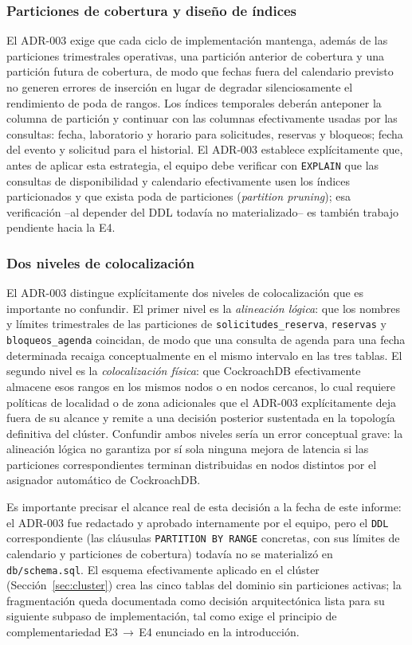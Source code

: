 \documentclass[10pt,twocolumn]{article}
\begin{document}
\subsubsection{Particiones de cobertura y diseño de índices}

El ADR-003 exige que cada ciclo de implementación mantenga, además de las
particiones trimestrales operativas, una partición anterior de cobertura y
una partición futura de cobertura, de modo que fechas fuera del calendario
previsto no generen errores de inserción en lugar de degradar
silenciosamente el rendimiento de poda de rangos. Los índices temporales
deberán anteponer la columna de partición y continuar con las columnas
efectivamente usadas por las consultas: fecha, laboratorio y horario para
solicitudes, reservas y bloqueos; fecha del evento y solicitud para el
historial. El ADR-003 establece explícitamente que, antes de aplicar esta
estrategia, el equipo debe verificar con \texttt{EXPLAIN} que las consultas
de disponibilidad y calendario efectivamente usen los índices particionados
y que exista poda de particiones (\emph{partition pruning}); esa
verificación --al depender del DDL todavía no materializado-- es también
trabajo pendiente hacia la E4.

\subsubsection{Dos niveles de colocalización}

El ADR-003 distingue explícitamente dos niveles de colocalización que es
importante no confundir. El primer nivel es la \emph{alineación lógica}:
que los nombres y límites trimestrales de las particiones de
\texttt{solicitudes\_reserva}, \texttt{reservas} y \texttt{bloqueos\_agenda}
coincidan, de modo que una consulta de agenda para una fecha determinada
recaiga conceptualmente en el mismo intervalo en las tres tablas. El
segundo nivel es la \emph{colocalización física}: que CockroachDB
efectivamente almacene esos rangos en los mismos nodos o en nodos cercanos,
lo cual requiere políticas de localidad o de zona adicionales que el
ADR-003 explícitamente deja fuera de su alcance y remite a una decisión
posterior sustentada en la topología definitiva del clúster. Confundir
ambos niveles sería un error conceptual grave: la alineación lógica no
garantiza por sí sola ninguna mejora de latencia si las particiones
correspondientes terminan distribuidas en nodos distintos por el
asignador automático de CockroachDB.

Es importante precisar el alcance real de esta decisión a la fecha de este
informe: el ADR-003 fue redactado y aprobado internamente por el equipo,
pero el \texttt{DDL} correspondiente (las cláusulas
\texttt{PARTITION BY RANGE} concretas, con sus límites de calendario y
particiones de cobertura) todavía no se materializó en
\texttt{db/schema.sql}. El esquema efectivamente aplicado en el clúster
(Sección~\ref{sec:cluster}) crea las cinco tablas del dominio sin
particiones activas; la fragmentación queda documentada como decisión
arquitectónica lista para su siguiente subpaso de implementación, tal como
exige el principio de complementariedad E3\,$\rightarrow$\,E4 enunciado en
la introducción.
\end{document}

